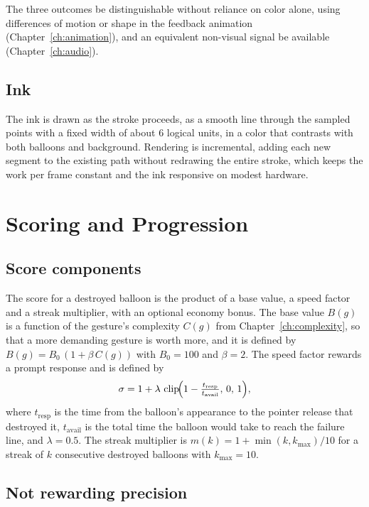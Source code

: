 \begin{requirement}\label{req:outcomes}
The three outcomes \must{} be distinguishable without reliance on color alone, using differences of motion or shape in the feedback animation (Chapter~\ref{ch:animation}), and an equivalent non-visual signal \should{} be available (Chapter~\ref{ch:audio}).\evS
\end{requirement}

\section{Ink}

The ink is drawn as the stroke proceeds, as a smooth line through the sampled points with a fixed width of about 6 logical units, in a color that contrasts with both balloons and background. Rendering is incremental, adding each new segment to the existing path without redrawing the entire stroke, which keeps the work per frame constant and the ink responsive on modest hardware.

\chapter{Scoring and Progression}\label{ch:scoring}

\section{Score components}

The score for a destroyed balloon is the product of a base value, a speed factor and a streak multiplier, with an optional economy bonus. The base value $B(g)$ is a function of the gesture's complexity $C(g)$ from Chapter~\ref{ch:complexity}, so that a more demanding gesture is worth more, and it is defined by $B(g)=B_0\,(1+\beta\,C(g))$ with $B_0=100$ and $\beta=2$.\evS{} The speed factor rewards a prompt response and is defined by
\[
\sigma=1+\lambda\,\operatorname{clip}\!\Bigl(1-\tfrac{t_{\mathrm{resp}}}{t_{\mathrm{avail}}},\,0,\,1\Bigr),
\]
where $t_{\mathrm{resp}}$ is the time from the balloon's appearance to the pointer release that destroyed it, $t_{\mathrm{avail}}$ is the total time the balloon would take to reach the failure line, and $\lambda=0.5$. The streak multiplier is $m(k)=1+\min(k,k_{\max})/10$ for a streak of $k$ consecutive destroyed balloons with $k_{\max}=10$.

\section{Not rewarding precision}

